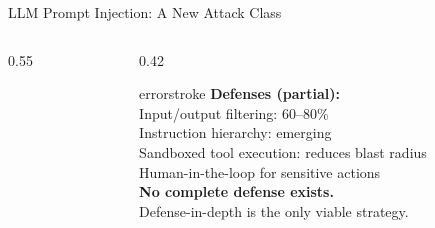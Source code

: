 \documentclass[aspectratio=169, 12pt]{beamer}
\begin{document}
\begin{frame}{LLM Prompt Injection: A New Attack Class}
\begin{columns}[T]
\begin{column}{0.55\textwidth}
    \vspace{0.1cm}
  \end{column}
  \begin{column}{0.42\textwidth}
    \begin{mlsyscard}{errorstroke}
    \textbf{Defenses (partial):}\\[0.05cm]
    {\scriptsize
    Input/output filtering: 60--80\%\\
    Instruction hierarchy: emerging\\
    Sandboxed tool execution: reduces blast radius\\
    Human-in-the-loop for sensitive actions\\[0.1cm]
    \textbf{No complete defense exists.}\\
    Defense-in-depth is the only viable strategy.}
    \end{mlsyscard}
  \end{column}
\end{columns}

\end{frame}
\end{document}
